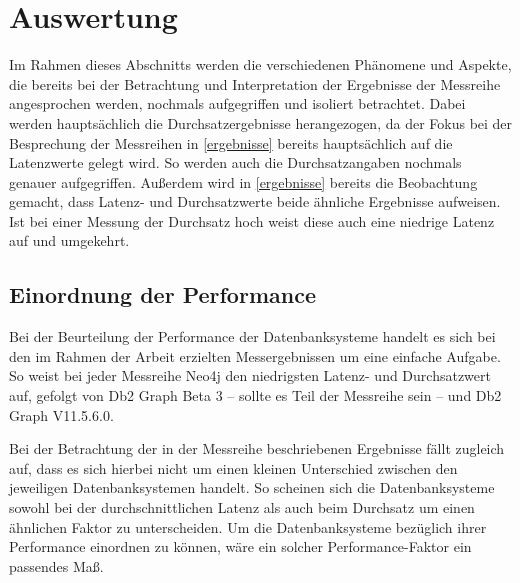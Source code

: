 \chapter{Auswertung}
\label{auswertung}
Im Rahmen dieses Abschnitts werden die verschiedenen Phänomene und Aspekte, die bereits bei der Betrachtung und Interpretation der Ergebnisse der Messreihe angesprochen werden, nochmals aufgegriffen und isoliert betrachtet. Dabei werden hauptsächlich die Durchsatzergebnisse herangezogen, da der Fokus bei der Besprechung der Messreihen in \autoref{ergebnisse} bereits hauptsächlich auf die Latenzwerte gelegt wird. So werden auch die Durchsatzangaben nochmals genauer aufgegriffen. Außerdem wird in \autoref{ergebnisse} bereits die Beobachtung gemacht, dass Latenz- und Durchsatzwerte beide ähnliche Ergebnisse aufweisen. Ist bei einer Messung der Durchsatz hoch weist diese auch eine niedrige Latenz auf und umgekehrt.

\section{Einordnung der Performance}
\label{auswertung:einordnung}
Bei der Beurteilung der Performance der Datenbanksysteme handelt es sich bei den im Rahmen der Arbeit erzielten Messergebnissen um eine einfache Aufgabe. So weist bei jeder Messreihe Neo4j den niedrigsten Latenz- und Durchsatzwert auf, gefolgt von Db2 Graph Beta 3 -- sollte es Teil der Messreihe sein -- und Db2 Graph V11.5.6.0. 

Bei der Betrachtung der in der Messreihe beschriebenen Ergebnisse fällt zugleich auf, dass es sich hierbei nicht um einen kleinen Unterschied zwischen den jeweiligen Datenbanksystemen handelt. So scheinen sich die Datenbanksysteme sowohl bei der durchschnittlichen Latenz als auch beim Durchsatz um einen ähnlichen Faktor zu unterscheiden. Um die Datenbanksysteme bezüglich ihrer Performance einordnen zu können, wäre ein solcher Performance-Faktor ein passendes Maß. 

